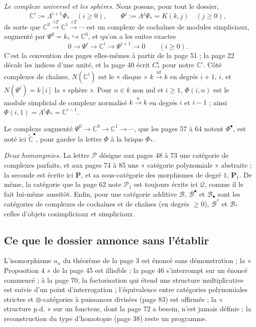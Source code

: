 \documentclass[11pt,a4paper]{article}
\begin{document}
\emph{Le complexe universel et les sphères.} Nous posons, pour tout le
dossier,
\[
  \mathbb{C}^{i} := \Lambda^{i+1}\Phi_{*} \quad (i \geqslant 0), \qquad
  \Psi^{j} := \Lambda^{j}\Psi_{*} = K(k, j) \quad (j \geqslant 0),
\]
de sorte que $\mathbb{C}^{0} \xrightarrow{\wedge T} \mathbb{C}^{1}
\xrightarrow{\wedge T} \cdots$ est un complexe de cochaînes de modules
simpliciaux, augmenté par $\Psi^{0} = k_{*} \hookrightarrow \mathbb{C}^{0}$,
et qu'on a les suites exactes
\[
  0 \to \Psi^{i} \to \mathbb{C}^{i} \to \Psi^{i+1} \to 0 \qquad (i \geqslant 0).
\]
C'est la convention des pages elles-mêmes à partir de la page 51 ; la page 22
décale les indices d'une unité, et la page 40 écrit $C^{i}_{*}$ pour notre
$\mathbb{C}^{i}$. Côté complexes de chaînes, $N(\mathbb{C}^{i})$ est le
« disque » $k \xrightarrow{\mathrm{id}} k$ en degrés $i+1$, $i$, et
$N(\Psi^{i}) = k[i]$ la « sphère ». Pour $n \in k$ non nul et $i \geqslant 1$,
$\Phi(i,n)$ est le module simplicial de complexe normalisé
$k \xrightarrow{\,n\,} k$ en degrés $i$ et $i-1$ ; ainsi
$\Phi(i,1) = \Lambda^{i}\Phi_{*} = \mathbb{C}^{i-1}$.

Le complexe augmenté $\Psi^{0} \to \mathbb{C}^{0} \to \mathbb{C}^{1} \to
\cdots$, que les pages 57 à 64 notent $\Phi^{\bullet}$, est noté ici
$\widetilde{\mathbb{C}}^{\bullet}$, pour garder la lettre $\Phi$ à la brique
$\Phi_{*}$.

\emph{Deux homonymies.} La lettre $\mathcal{P}$ désigne aux pages 48 à 73 une
catégorie de complexes parfaits, et aux pages 74 à 85 une « catégorie
polynomiale » abstraite ; la seconde est écrite ici $\mathbf{P}$, et sa
sous-catégorie des morphismes de degré $1$, $\mathbf{P}_{1}$. De même, la
catégorie que la page 62 note $\mathcal{P}_{1}$ est toujours écrite ici
$\mathcal{Q}$, comme il le fait lui-même aussitôt. Enfin, pour une catégorie
additive $\mathcal{B}$, $\mathcal{B}^{\bullet}$ et $\mathcal{B}_{\bullet}$
sont les catégories de complexes de cochaînes et de chaînes (en degrés
$\geqslant 0$), $\mathcal{B}^{*}$ et $\mathcal{B}_{*}$ celles d'objets
cosimpliciaux et simpliciaux.

\subsection*{Ce que le dossier annonce sans l'établir}

L'isomorphisme $u_{n}$ du théorème de la page 3 est énoncé sans
démonstration ; la « Proposition 4 » de la page 45 est illisible ; la page 46
s'interrompt sur un énoncé commencé ; à la page 70, la factorisation qui
étend une structure multiplicative est suivie d'un point d'interrogation ;
l'équivalence entre catégories polynomiales strictes et
$\otimes$-catégories à puissances divisées (page 83) est affirmée ; la
« structure p.d. » sur un foncteur, dont la page 72 a besoin, n'est jamais
définie ; la reconstruction du type d'homotopie (page 38) reste un
programme.
\end{document}
